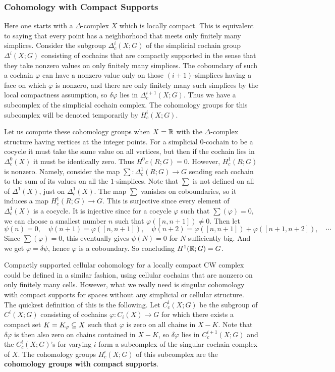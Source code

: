 \subsubsection{Cohomology with Compact Supports}
Here one starts with a $\Delta$-complex $X$ which is locally compact. This is equivalent to saying that every point has a neighborhood that meets only finitely many simplices. Consider the subgroup $\Delta^i_c(X;G)$ of the simplicial cochain group $\Delta^i(X;G)$ consisting of cochains that are compactly supported in the sense that they take nonzero values on only finitely many simplices. The coboundary of such a cochain $\varphi$ can have a nonzero value only on those $(i+1)$-simplices having a face on which $\varphi$ is nonzero, and there are only finitely many such simplices by the local compactness assumption, so $\delta\varphi$ lies in $\Delta^{i+1}_c(X;G)$. Thus we have a subcomplex of the simplicial cochain complex. The cohomology groups for this subcomplex will be denoted temporarily by $H^i_c(X;G)$.
\begin{example}
Let us compute these cohomology groups when $X=\mathbb{R}$ with the $\Delta$-complex structure having vertices at the integer points. For a simplicial $0$-cochain
to be a cocycle it must take the same value on all vertices, but then if the cochain lies in $\Delta^0_c(X)$ it must be identically zero. Thus $H^0c(R;G)=0$. However, $H^1_c(R;G)$ is nonzero. Namely, consider the map $\sum:\Delta^1_c(R;G)\to G$ sending each cochain to the sum of its values on all the $1$-simplices. Note that $\sum$ is not defined on all of $\Delta^1(X)$, just on $\Delta^1_c(X)$. The map $\sum$ vanishes on coboundaries, so it induces a map $H^1_c(R;G)\to G$. This is surjective since every element of $\Delta^1_c(X)$ is a cocycle. It is injective since for a cocycle $\varphi$ such that $\sum(\varphi)=0$, we can choose a smallest number $n$ such that $\varphi([n,n+1])\neq 0$. Then let 
\[\psi(n)=0,\quad\psi(n+1)=\varphi([n,n+1]),\quad \psi(n+2)=\varphi([n,n+1])+\varphi([n+1,n+2]),\quad\cdots\]
Since $\sum(\varphi)=0$, this eventually gives $\psi(N)=0$ for $N$ sufficiently big. And we get $\varphi=\delta\psi$, hence $\varphi$ is a coboundary. So concluding $H^1(\mathbb{R};G)=G$.
\end{example}
Compactly supported cellular cohomology for a locally compact CW complex could be defined in a similar fashion, using cellular cochains that are nonzero on only finitely many cells. However, what we really need is singular cohomology with compact supports for spaces without any simplicial or cellular structure. The quickest definition of this is the following. Let $C^i_c(X;G)$ be the subgroup of $C^i(X;G)$ consisting of cochains $\varphi:C_i(X)\to G$ for which there exists a compact set $K=K_\varphi\subseteq X$ such that $\varphi$ is zero on all chains in $X-K$. Note that $\delta\varphi$ is then also zero on chains contained in $X-K$, so $\delta\varphi$ lies in $C^{i+1}_c(X;G)$ and the $C^i_c(X;G)$'s for varying $i$ form a subcomplex of the singular cochain complex of $X$. The cohomology groups $H^i_c(X;G)$ of this subcomplex are the \textbf{cohomology groups with compact supports}.\par
